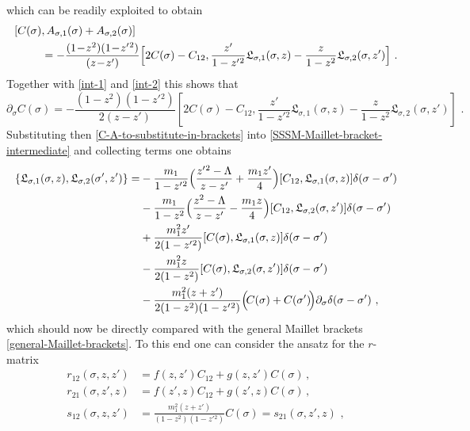 \documentclass[12pt]{article}
\numberwithin{equation}{section}
\begin{document}
which can be readily exploited to obtain 
\begin{equation}\label{C-A-to-substitute-in-brackets}
\begin{aligned}
[C(\sigma)&,A_{\sigma,1}(\sigma)+A_{\sigma,2}(\sigma)]
\\
&=-\frac{(1\!-\!z^2)(1\!-\!z'{}^2)}{(z\!-\!z')}\Bigl[ 2C(\sigma)-C_{12} , \frac{z'}{1-z'{}^2}\mathfrak{L}_{\sigma,1}(\sigma,z) -\frac{z}{1-z^2}\mathfrak{L}_{\sigma,2}(\sigma,z')\Bigr] \,\, .
\end{aligned}
\end{equation}
Together with \eqref{int-1} and \eqref{int-2} this shows that
\begin{equation}\label{C-derivative}
\partial_{\sigma}C(\sigma)=-\frac{(1-z^2)(1-z'{}^2)}{2(z-z')}[2C(\sigma)-C_{12},\frac{z'}{1-z'{}^2}\mathfrak{L}_{\sigma,1}(\sigma,z)-\frac{z}{1-z^2}\mathfrak{L}_{\sigma,2}(\sigma,z')] \,\, .
\end{equation}
Substituting then \eqref{C-A-to-substitute-in-brackets} into \eqref{SSSM-Maillet-bracket-intermediate} and collecting terms one obtains
\begin{equation}\label{SSSM-Maillet-to-compare}
\begin{aligned}
\{ \mathfrak{L}_{\sigma,1}(\sigma,z),\mathfrak{L}_{\sigma,2}(\sigma',z') \}=&
-\frac{m_{1}}{1-z'{}^2}\Bigl( \frac{z'{}^2-\Lambda}{z-z'}+\frac{m_{1}z'}{4} \Bigr)[C_{12},\mathfrak{L}_{\sigma,1}(\sigma,z)]\delta(\sigma-\sigma')
\\
&-\frac{m_{1}}{1-z^2}\Bigl( \frac{z^2-\Lambda}{z-z'}-\frac{m_{1}z}{4} \Bigr)[C_{12},\mathfrak{L}_{\sigma,2}(\sigma,z')]\delta(\sigma-\sigma')
\\
&+\frac{m_{1}^2z'}{2(1-z'{}^2)}[C(\sigma),\mathfrak{L}_{\sigma,1}(\sigma,z)]\delta(\sigma-\sigma')
\\
&-\frac{m_{1}^2z}{2(1-z^2)}[C(\sigma),\mathfrak{L}_{\sigma,2}(\sigma,z')]\delta(\sigma-\sigma')
\\
&-\frac{m_{1}^2(z+z')}{2(1-z^2)(1-z'{}^2)}\Bigl(\! C(\sigma)+C(\sigma') \! \Bigr)\partial_{\sigma}\delta(\sigma-\sigma') \,\, ,
\end{aligned}
\end{equation}
which should now be directly compared with the general Maillet brackets \eqref{general-Maillet-brackets}. To this end one can consider the ansatz for the $r$-matrix
\begin{equation}\label{SSSM-r-matrix-ansatz}
\begin{aligned}
r_{12}(\sigma,z,z')&=f(z,z')C_{12}+g(z,z')C(\sigma) \, ,
\\
r_{21}(\sigma,z',z)&=f(z',z)C_{12}+g(z',z)C(\sigma) \, , 
\\
s_{12}(\sigma,z,z')&=\frac{m_{1}^2(z+z')}{(1-z^2)(1-z'{}^2)}C(\sigma)=s_{21}(\sigma,z',z) \,\, ,
\end{aligned}
\end{equation}
\end{document}
